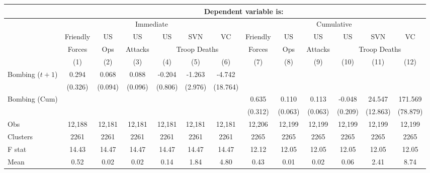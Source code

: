 \begin{tabular}{lcccccccccccc}
\hline  & \multicolumn{12}{c}{Dependent variable is:}\\
\hline  & \multicolumn{6}{c}{Immediate} & \multicolumn{6}{c}{Cumulative}\\
 & Friendly & US & US & US & SVN & VC & Friendly & US & US & US & SVN & VC\\
 & Forces & Ops & Attacks & \multicolumn{3}{c}{Troop Deaths} & Forces & Ops & Attacks & \multicolumn{3}{c}{Troop Deaths}\\
 & (1) & (2) & (3) & (4) & (5) & (6) & (7) & (8) & (9) & (10) & (11) & (12)\\
\hline Bombing ($ t+1$) & 0.294 & 0.068 & 0.088 & -0.204 & -1.263 & -4.742 &  &  &  &  &  & \\
 & (0.326) & (0.094) & (0.096) & (0.806) & (2.976) & (18.764) &  &  &  &  &  & \\
Bombing (Cum) &  &  &  &  &  &  & 0.635 & 0.110 & 0.113 & -0.048 & 24.547 & 171.569\\
 &  &  &  &  &  &  & (0.312) & (0.063) & (0.063) & (0.209) & (12.863) & (78.879)\\
Obs & 12,188 & 12,181 & 12,181 & 12,181 & 12,181 & 12,181 & 12,206 & 12,199 & 12,199 & 12,199 & 12,199 & 12,199\\
Clusters & 2261  & 2261  & 2261  & 2261  & 2261  & 2261  & 2265  & 2265  & 2265  & 2265  & 2265  & 2265 \\
F stat & 14.43  & 14.47  & 14.47  & 14.47  & 14.47  & 14.47  & 12.12  & 12.05  & 12.05  & 12.05  & 12.05  & 12.05 \\
Mean & 0.52 & 0.02 & 0.02 & 0.14 & 1.84 & 4.80 & 0.43 & 0.01 & 0.02 & 0.06 & 2.41 & 8.74\\
\hline\end{tabular}\\
